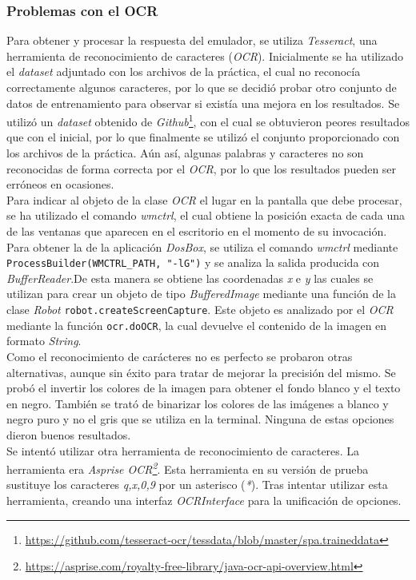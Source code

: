 \documentclass[10pt,a4paper]{article}
\begin{document}
\subsubsection{Problemas con el OCR}

Para obtener y procesar la respuesta del emulador, se utiliza \textit{Tesseract}, una herramienta de reconocimiento de caracteres (\textit{OCR}). Inicialmente se ha utilizado el \textit{dataset} adjuntado con los archivos de la práctica, el cual no reconocía correctamente algunos caracteres, por lo que se decidió probar otro conjunto de datos de entrenamiento para observar si existía una mejora en los resultados. Se utilizó un \textit{dataset} obtenido de \textit{Github}\footnote{\url{https://github.com/tesseract-ocr/tessdata/blob/master/spa.traineddata}}, con el cual se obtuvieron peores resultados que con el inicial, por lo que finalmente se utilizó el conjunto proporcionado con los archivos de la práctica. Aún así, algunas palabras y caracteres no son reconocidas de forma correcta por el \textit{OCR}, por lo que los resultados pueden ser erróneos en ocasiones. \\
Para indicar al objeto de la clase \textit{OCR} el lugar en la pantalla que debe procesar, se ha utilizado el comando \textit{wmctrl}, el cual obtiene la posición exacta de cada una de las ventanas que aparecen en el escritorio en el momento de su invocación. Para obtener la de la aplicación \textit{DosBox}, se utiliza el comando \textit{wmctrl} mediante \texttt{ProcessBuilder(WMCTRL\_PATH, "-lG")} y se analiza la salida producida con \textit{BufferReader}.De esta manera se obtiene las coordenadas \textit{x} e \textit{y} las cuales se utilizan para crear un objeto de tipo \textit{BufferedImage} mediante una función de la clase \textit{Robot} \texttt{robot.createScreenCapture}. Este objeto es analizado por el \textit{OCR} mediante la función \texttt{ocr.doOCR}, la cual devuelve el contenido de la imagen en formato \textit{String}.\\

Como el reconocimiento de carácteres no es perfecto se probaron otras alternativas, aunque sin éxito para tratar de mejorar la precisión del mismo. Se probó el invertir los colores de la imagen para obtener el fondo blanco y el texto en negro. También se trató de binarizar los colores de las imágenes a blanco y negro puro y no el gris que se utiliza en la terminal. Ninguna de estas opciones dieron buenos resultados.\\
Se intentó utilizar otra herramienta de reconocimiento de caracteres. La herramienta era \emph{Asprise OCR\footnote{\url{https://asprise.com/royalty-free-library/java-ocr-api-overview.html}}}. Esta herramienta en su versión de prueba sustituye los caracteres \emph{q,x,0,9} por un asterisco (\emph{*}). Tras intentar utilizar esta herramienta, creando una interfaz \emph{OCRInterface} para la unificación de opciones.\\
\end{document}
